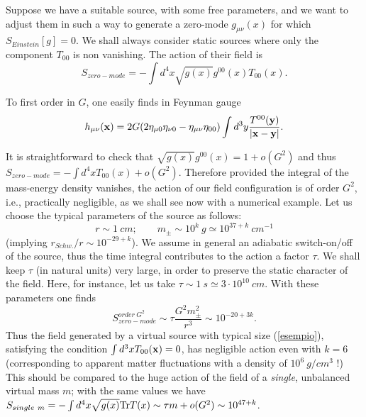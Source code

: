 \documentclass[a4paper,11pt]{article}
\begin{document}
Suppose we have a suitable source, with some free
parameters, and we want to adjust them in such a way
to generate a zero-mode $g_{\mu \nu}(x)$ for which
$S_{Einstein}[g]=0$. We shall always consider static
sources where only the component $T_{00}$ is non
vanishing. The action of their field is
	\begin{displaymath} 
	S_{zero-mode} = - \int d^4x \sqrt{g(x)}
	g^{00}(x) T_{00}(x).
\end{displaymath}

To first order in $G$, one easily finds in Feynman gauge
	\begin{displaymath}
	h_{\mu \nu}({\bf x})  
	= 2G (2\eta_{\mu 0} 
	\eta_{\nu 0} - \eta_{\mu \nu} \eta_{00})
	\int d^3y 
	\frac{T^{00}({\bf y})}{|{\bf x}-{\bf y}|}.
\end{displaymath}

It is straightforward to check that
$\sqrt{g(x)} g^{00}(x) = 1+o(G^2)$ and thus
$S_{zero-mode} = - \int d^4x T_{00}(x) + o(G^2)$.
Therefore provided the integral of the mass-energy density
vanishes, the action of our field configuration is of
order $G^2$, i.e., practically negligible, as we shall 
see now with a numerical example. Let us choose 
the typical parameters of the source as follows:
	\begin{equation}
	r \sim 1 \ cm; \qquad 
	m_\pm \sim 10^k \ g \simeq 10^{37+k} \ cm^{-1}
\label{esempio}
\end{equation}
	(implying $r_{Schw.}/r \sim 10^{-29+k}$). 
We assume in general an adiabatic switch-on/off of the
source, thus the time integral contributes to the action
a factor $\tau$. We shall keep $\tau$ (in natural units)
very large, in order to preserve the static character 
of the field. Here, for instance, let us take
$\tau \sim 1\ s \simeq 3 \cdot 10^{10} \ cm$.
With these parameters one finds
	\begin{displaymath}
	S_{zero-mode}^{order \ G^2} 
	\sim \tau \frac{G^2 m_\pm^2}{r^3}
	\sim 10^{-20+3k}.
\end{displaymath}  
	Thus the field generated by a virtual source 
with typical size (\ref{esempio}), satisfying the condition
$\int d^3x T_{00}({\bf x}) = 0$, has negligible action
even with $k=6$ (corresponding to apparent matter 
fluctuations with a density of $10^6 \ g/cm^3$ !) 
This should be compared to the huge action of the field
of a {\it single}, unbalanced virtual mass $m$; with 
the same values we have
$ S_{single \ m} = - \int d^4x \sqrt{g(x)} 
{\rm Tr} T(x) \sim \tau m + o(G^2) \sim 10^{47+k}$.
\end{document}

